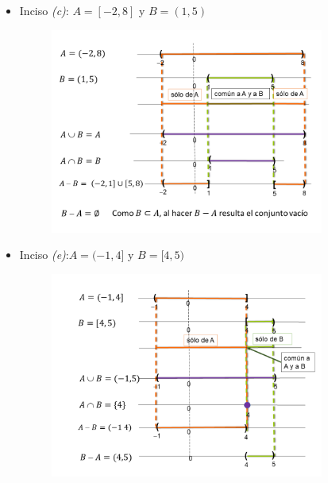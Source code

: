 \documentclass[12pt]{article}
\theoremstyle{definition}
\begin{document}
\begin{enumerate}
\begin{itemize}
\item Inciso \textit{(c)}: $A = [-2, 8]$ y $B = (1,5)$
\begin{figure}[H]
\centering
\includegraphics[width=0.85\textwidth]{11-2.png}
\end{figure}

\item Inciso \textit{(e)}:$A = (-1, 4]$ y $B = [4,5)$

\begin{figure}[H]
\centering
\includegraphics[width=0.85\textwidth]{11-3.png}
\end{figure}

\end{itemize}


\end{enumerate}
\end{document}
